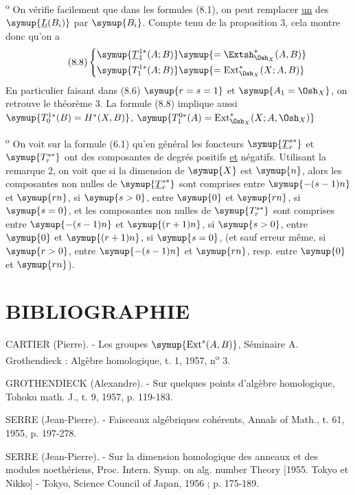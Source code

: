\medskip
{}\textsuperscript{o} On vérifie facilement que dans les formules
(8.1), on peut remplacer \uline{un} des $\symup{\underline{L}(B_i)}$ par $\symup{B_i}$. Compte tenu de la
proposition 3, cela montre donc qu'on a
\begin{equation}\tag{8.8}
\left\{
\begin{aligned}\symup{\underline{T}_{1}^{1*}(A;B)}&\symup{=\Extsh_{\Osh_X}^{*}(A,B)}\\\symup{T_{1}^{1*}(A;B)}&\symup{=\operatorname{Ext}_{\Osh_X}^{*}(X;A,B)}\end{aligned}
\right.
\end{equation}
En particulier faisant dans (8.6) $\symup{r=s=1}$ et $\symup{A_1=\Osh_X}$, on retrouve le
théorème 3. La formule (8.8) implique aussi
$\symup{T_{0}^{1*}(B)=H^{*}(X,B)}$, $\symup{T_{1}^{0*}(A)=\operatorname{Ext}_{\Osh_X}^{*}(X;A,\Osh_X)}$

\medskip
{}\textsuperscript{o} On voit sur la formule (6.1) qu'en général les
foncteurs $\symup{\underline{T}_{r}^{s*}}$ et $\symup{T_{r}^{s*}}$ ont des composantes de
degrés positifs \uline{et} négatifs. Utilisant la remarque 2, on voit que si la
dimension de $\symup{X}$ est $\symup{n}$, alors les composantes non nulles de
$\symup{\underline{T}_{r}^{s*}}$ sont comprises entre $\symup{-(s-1)n}$ et $\symup{rn}$, si $\symup{s>0}$,
entre $\symup{0}$ et $\symup{rn}$, si $\symup{s=0}$, et les composantes non nulles de $\symup{T_{r}^{s*}}$
sont comprises entre $\symup{-(s-1)n}$ et $\symup{(r+1)n}$, si $\symup{s>0}$, entre $\symup{0}$ et $\symup{(r+1)n}$,
si $\symup{s=0}$, (et sauf erreur même, si $\symup{r>0}$, entre $\symup{-(s-1)n}$ et $\symup{rn}$, resp. entre
$\symup{0}$ et $\symup{rn}$).

\section*{\centering\normalfont BIBLIOGRAPHIE}

\noindent[1] CARTIER (Pierre). - Les groupes
$\symup{\operatorname{Ext}^{s}(A,B)}$, Séminaire A. Grothendieck : Algèbre homologique,
t. 1, 1957, n\textsuperscript{o} 3.

\noindent[2] GROTHENDIECK (Alexandre). - Sur quelques points d'algèbre
homologique, Tohoku math. J., t. 9, 1957, p. 119-183.

\noindent[3] SERRE (Jean-Pierre). - Faisceaux algébriques cohérents,
Annals of Math., t. 61, 1955, p. 197-278.

\noindent[4] SERRE (Jean-Pierre). - Sur la dimension homologique des anneaux
et des modules noethériens, Proc. Intern. Symp. on alg. number Theory
[1955. Tokyo et Nikko] - Tokyo, Science Council of Japan, 1956 ;
p. 175-189.

